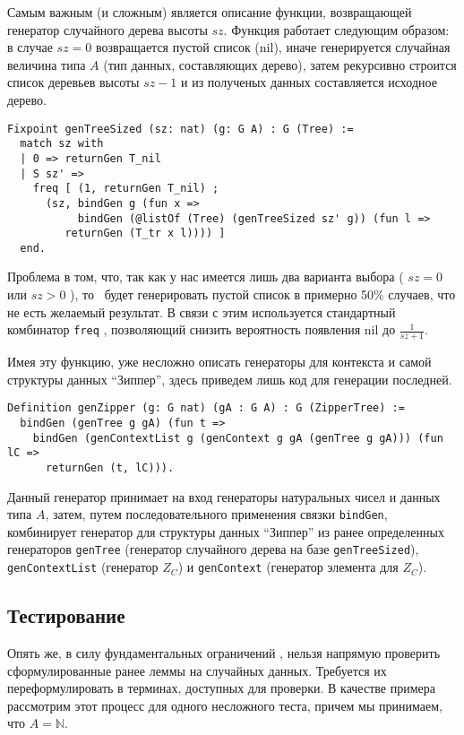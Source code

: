 Самым важным (и сложным) является описание функции, возвращающей генератор случайного дерева высоты $sz$. Функция работает следующим образом: в случае $sz  = 0$ возвращается пустой список (nil), иначе генерируется случайная величина типа $A$ (тип данных, составляющих дерево), затем рекурсивно строится список деревьев высоты $sz - 1$ и из полученых данных составляется исходное дерево.

\begin{lstlisting}
Fixpoint genTreeSized (sz: nat) (g: G A) : G (Tree) :=
  match sz with
  | 0 => returnGen T_nil
  | S sz' =>
    freq [ (1, returnGen T_nil) ;
      (sz, bindGen g (fun x =>
           bindGen (@listOf (Tree) (genTreeSized sz' g)) (fun l =>
         returnGen (T_tr x l)))) ]
  end.
\end{lstlisting}

Проблема в том, что, так как у нас имеется лишь два варианта выбора ( $sz = 0$ или $sz > 0$ ), то \tqc~будет генерировать пустой список в примерно 50\% случаев, что не есть желаемый результат. В связи с этим используется стандартный комбинатор \texttt{freq} \autocite{QuickChickRM}, позволяющий снизить вероятность появления nil до $\frac{1}{sz + 1}$.

Имея эту функцию, уже несложно описать генераторы для контекста и самой структуры данных ``Зиппер'', здесь приведем лишь код для генерации последней.
\begin{lstlisting}
Definition genZipper (g: G nat) (gA : G A) : G (ZipperTree) :=
  bindGen (genTree g gA) (fun t =>
    bindGen (genContextList g (genContext g gA (genTree g gA))) (fun lC =>
      returnGen (t, lC))).
\end{lstlisting}

Данный генератор принимает на вход генераторы натуральных чисел и данных типа $A$, затем, путем последовательного применения связки \texttt{bindGen}, комбинирует генератор для структуры данных ``Зиппер'' из ранее определенных генераторов \texttt{genTree} (генератор случайного дерева на базе \texttt{genTreeSized}), \texttt{genContextList} (генератор $Z_C$) и \texttt{genContext} (генератор элемента для $Z_C$).

\subsection{Тестирование}

Опять же, в силу фундаментальных ограничений \tqc, нельзя напрямую проверить сформулированные ранее леммы на случайных данных. Требуется их переформулировать в терминах, доступных для проверки. В качестве примера рассмотрим этот процесс для одного несложного теста, причем мы принимаем, что $A = \mathbb{N}$.

